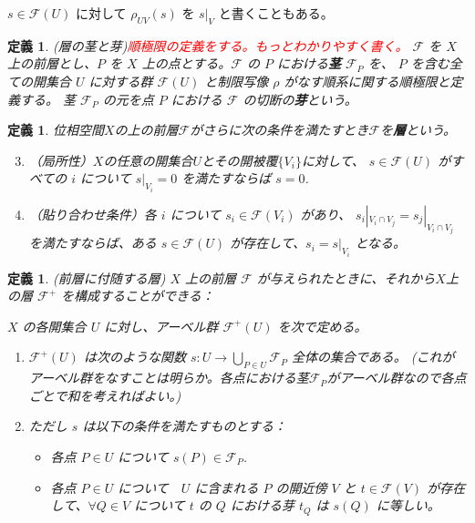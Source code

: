 \documentclass[uplatex, 12pt]{jsreport}
\newtheorem{dfn}[thm]{定義}
\newcommand{\mcF}{\mathcal{F}}
\begin{document}
$s \in \mcF(U)$ に対して $\rho_{UV}(s)$ を $s|_V$ と書くこともある。

\begin{dfn}{(層の茎と芽)\textcolor{red}{順極限の定義をする。もっとわかりやすく書く。}}
    $\mcF$ を $X$ 上の前層とし、$P$ を $X$ 上の点とする。$\mcF$ の $P$ における\textbf{茎} $\mcF_P$ を、
    $P$ を含む全ての開集合 $U$ に対する群 $\mcF(U)$ と制限写像 $\rho$ がなす順系に関する順極限と定義する。
    茎 $\mcF_P$ の元を点 $P$ における $\mcF$ の切断の\textbf{芽}という。
\end{dfn}

\begin{dfn}
    位相空間$X$の上の前層$\mcF$がさらに次の条件を満たすとき$\mcF$を\textbf{層}という。
    \begin{enumerate}
        \setcounter{enumi}{2}
        \item （局所性）$X$の任意の開集合$U$とその開被覆$\{V_i\}$に対して、
              $s \in \mcF(U)$ がすべての $i$ について $s|_{V_i} = 0$ を満たすならば $s = 0$.
        \item （貼り合わせ条件）各 $i$ について $s_i \in \mcF(V_i)$ があり、
              $s_i|_{V_i \cap V_j} = s_j|_{V_i \cap V_j}$　を満たすならば、ある $s \in \mcF(U)$
              が存在して、$s_i = s|_{V_i}$ となる。
    \end{enumerate}
\end{dfn}

\begin{dfn}{(前層に付随する層)}
    $X$ 上の前層 $\mcF$ が与えられたときに、それから$X$上の層 $\mcF^+$ を構成することができる：

    $X$ の各開集合 $U$ に対し、アーベル群 $\mcF^+(U)$ を次で定める。

    \begin{enumerate}
        \item $\mcF^+(U)$ は次のような関数 $s: U \to \bigcup_{P \in U} \mcF_P$ 全体の集合である。
        (これがアーベル群をなすことは明らか。各点における茎$\mcF_P$がアーベル群なので各点ごとで和を考えればよい。)
        \item ただし $s$ は以下の条件を満たすものとする：
              \begin{itemize}
                  \item 各点 $P \in U$ について $s(P) \in \mcF_P$.
                  \item 各点 $P \in U$ について　$U$ に含まれる $P$ の開近傍 $V$ と
                        $t \in \mcF(V)$ が存在して、$\forall Q \in V$ について
                        $t$ の $Q$ における芽 $t_Q$ は $s(Q)$ に等しい。
              \end{itemize}

    \end{enumerate}

\end{dfn}
\end{document}
